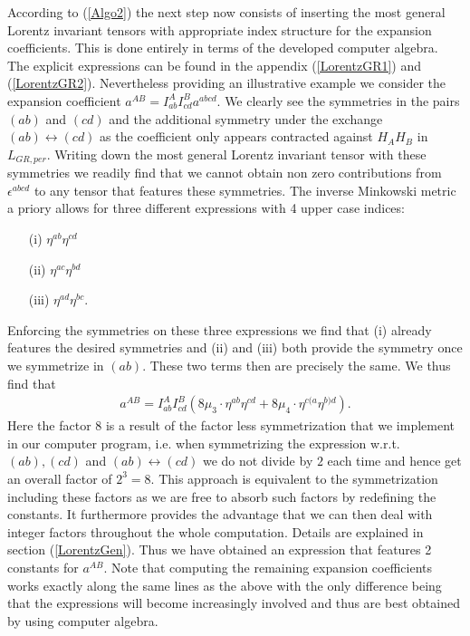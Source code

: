 \documentclass[a4paper,12pt, DIV=14, BCOR=5mm, twoside, headsepline, numbers=noenddot]{scrbook}
\begin{document}
According to (\ref{Algo2}) the next step now consists of inserting the most general Lorentz invariant tensors with appropriate index structure for the expansion coefficients. This is done entirely in terms of the developed computer algebra. The explicit expressions can be found in the appendix (\ref{LorentzGR1}) and (\ref{LorentzGR2}).
Nevertheless providing an illustrative example we consider the expansion coefficient $a^{AB} = I^{A}_{ab}I^{B}_{cd}a^{abcd}$. We clearly see the symmetries in the pairs $(ab)$ and $(cd)$ and the additional symmetry under the exchange $(ab) \leftrightarrow (cd)$ as the coefficient only appears contracted against $H_AH_B$ in $L_{GR,per}$. Writing down the most general Lorentz invariant tensor with these symmetries we readily find that we cannot obtain non zero contributions from $\epsilon^{abcd}$ to any tensor that features these symmetries. The inverse Minkowski metric a priory allows for three different expressions with 4 upper case indices:
\begin{itemize}
    \item[(i)] $\eta^{ab} \eta^{cd}$ 
    \item[(ii)] $\eta^{ac} \eta^{bd}$ 
    \item[(iii)] $\eta^{ad} \eta^{bc}$.
\end{itemize}
Enforcing the symmetries on these three expressions we find that (i) already features the desired symmetries and (ii) and (iii) both provide the symmetry once we symmetrize in $(ab)$. These two terms then are precisely the same. We thus find that 
\begin{align}\label{ansatzExample}
    a^{AB} = I^{A}_{ab}I^{B}_{cd} \left ( 8\mu_3 \cdot \eta^{ab}\eta^{cd} + 8\mu_4 \cdot \eta^{c(a} \eta^{b)d}   \right ).
\end{align}
Here the factor $8$ is a result of the factor less symmetrization that we implement in our computer program, i.e. when symmetrizing the expression w.r.t. $(ab),(cd)$ and $(ab) \leftrightarrow (cd) $ we do not divide by $2$ each time and hence get an overall factor of $2^3=8$. This approach is equivalent to the symmetrization including these factors as we are free to absorb such factors by redefining the constants. It furthermore provides the advantage that we can then deal with integer factors throughout the whole computation. Details are explained in section (\ref{LorentzGen}).
Thus we have obtained an expression that features 2 constants for $a^{AB}$.
Note that computing the remaining expansion coefficients works exactly along the same lines as the above with the only difference being that the expressions will become increasingly involved and thus are best obtained by using computer algebra.
\end{document}

